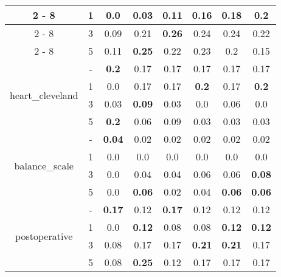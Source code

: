 \documentclass{article}%
\begin{document}
\begin{longtable}{c|c|cccccc}
\cline{2%
-%
8}%
&1&0.0&0.03&0.11&0.16&0.18&\textbf{0.2}\\%
\cline{2%
-%
8}%
&3&0.09&0.21&\textbf{0.26}&0.24&0.24&0.22\\%
\cline{2%
-%
8}%
&5&0.11&\textbf{0.25}&0.22&0.23&0.2&0.15\\%
\hline%
\multirow{4}{*}{heart\_cleveland}&{-}&\textbf{0.2}&0.17&0.17&0.17&0.17&0.17\\%
\cline{2%
-%
8}%
&1&0.0&0.17&0.17&\textbf{0.2}&0.17&\textbf{0.2}\\%
\cline{2%
-%
8}%
&3&0.03&\textbf{0.09}&0.03&0.0&0.06&0.0\\%
\cline{2%
-%
8}%
&5&\textbf{0.2}&0.06&0.09&0.03&0.03&0.03\\%
\hline%
\multirow{4}{*}{balance\_scale}&{-}&\textbf{0.04}&0.02&0.02&0.02&0.02&0.02\\%
\cline{2%
-%
8}%
&1&0.0&0.0&0.0&0.0&0.0&0.0\\%
\cline{2%
-%
8}%
&3&0.0&0.04&0.04&0.06&0.06&\textbf{0.08}\\%
\cline{2%
-%
8}%
&5&0.0&\textbf{0.06}&0.02&0.04&\textbf{0.06}&\textbf{0.06}\\%
\hline%
\multirow{4}{*}{postoperative}&{-}&\textbf{0.17}&0.12&\textbf{0.17}&0.12&0.12&0.12\\%
\cline{2%
-%
8}%
&1&0.0&\textbf{0.12}&0.08&0.08&\textbf{0.12}&\textbf{0.12}\\%
\cline{2%
-%
8}%
&3&0.08&0.17&0.17&\textbf{0.21}&\textbf{0.21}&0.17\\%
\cline{2%
-%
8}%
&5&0.08&\textbf{0.25}&0.12&0.17&0.17&0.17\\%
\hline%
\end{longtable}

%
\end{document}

